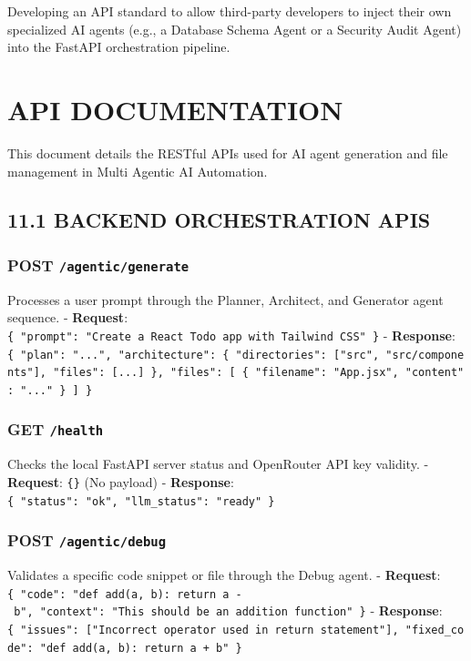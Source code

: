 \documentclass[
  12pt,
]{article}
\begin{document}
Developing an API standard to allow third-party developers to inject
their own specialized AI agents (e.g., a Database Schema Agent or a
Security Audit Agent) into the FastAPI orchestration pipeline.

\newpage

\section{API DOCUMENTATION}\label{api-documentation}

This document details the RESTful APIs used for AI agent generation and
file management in Multi Agentic AI Automation.

\subsection{11.1 BACKEND ORCHESTRATION
APIS}\label{backend-orchestration-apis}

\subsubsection{\texorpdfstring{POST
\texttt{/agentic/generate}}{POST /agentic/generate}}\label{post-agenticgenerate}

Processes a user prompt through the Planner, Architect, and Generator
agent sequence. - \textbf{Request}:
\texttt{\{\ "prompt":\ "Create\ a\ React\ Todo\ app\ with\ Tailwind\ CSS"\ \}}
- \textbf{Response}:
\texttt{\{\ "plan":\ "...",\ "architecture":\ \{\ "directories":\ {[}"src",\ "src/components"{]},\ "files":\ {[}...{]}\ \},\ "files":\ {[}\ \{\ "filename":\ "App.jsx",\ "content":\ "..."\ \}\ {]}\ \}}

\subsubsection{\texorpdfstring{GET
\texttt{/health}}{GET /health}}\label{get-health}

Checks the local FastAPI server status and OpenRouter API key validity.
- \textbf{Request}: \texttt{\{\}} (No payload) - \textbf{Response}:
\texttt{\{\ "status":\ "ok",\ "llm\_status":\ "ready"\ \}}

\subsubsection{\texorpdfstring{POST
\texttt{/agentic/debug}}{POST /agentic/debug}}\label{post-agenticdebug}

Validates a specific code snippet or file through the Debug agent. -
\textbf{Request}:
\texttt{\{\ "code":\ "def\ add(a,\ b):\ return\ a\ -\ b",\ "context":\ "This\ should\ be\ an\ addition\ function"\ \}}
- \textbf{Response}:
\texttt{\{\ "issues":\ {[}"Incorrect\ operator\ used\ in\ return\ statement"{]},\ "fixed\_code":\ "def\ add(a,\ b):\ return\ a\ +\ b"\ \}}
\end{document}
